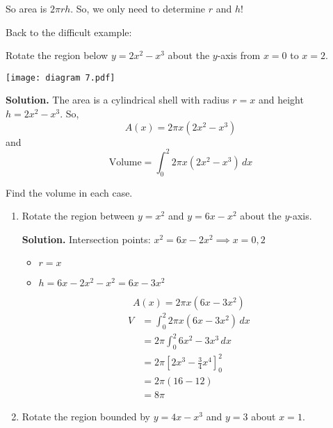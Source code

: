 So area is $ 2\pi rh $. So, we only need to determine $ r $ and $ h $!

Back to the difficult example:
\begin{Example}{}{}
    Rotate the region below $ y=2x^2-x^3 $ about the $ y $-axis from $ x=0 $ to $ x=2 $.
    \begin{center}
        \texttt{[image: diagram 7.pdf]}
    \end{center}
    \textbf{Solution.} The area is a cylindrical shell with radius $ r=x $ and height
    $ h=2x^2-x^3 $. So,
    \[ A(x)=2\pi x\left( 2x^2-x^3 \right) \]
    and
    \[ \text{Volume}=\int_{0}^{2}2\pi x\left( 2x^2-x^3 \right)\, d{x} \]
\end{Example}

\begin{Example}{}{}
    Find the volume in each case.
    \begin{enumerate}[label=(\roman*)]
        \item Rotate the region between $ y=x^2 $ and $ y=6x-x^2 $
              about the $ y $-axis.



              \textbf{Solution.} Intersection points:
              $ x^2=6x-2x^2\implies x=0,2 $
              \begin{itemize}
                  \item $ r=x $
                  \item $ h=6x-2x^2-x^2=6x-3x^2 $
              \end{itemize}
              \[ A(x)=2\pi x\left( 6x-3x^2 \right) \]
              \begin{align*}
                  V
                   & =\int_{0}^{2} 2\pi x\left( 6x-3x^2 \right)\, d{x} \\
                   & =2\pi \int_{0}^{2} 6x^2-3x^3\, d{x}               \\
                   & =2\pi\left[ 2x^3-\frac{3}{4} x^4 \right]_0^2      \\
                   & =2\pi\left( 16-12 \right)                         \\
                   & =8\pi
              \end{align*}
        \item Rotate the region bounded by $ y=4x-x^3 $ and $ y=3 $ about
              $ x= 1 $.


\end{enumerate}
\end{Example}

